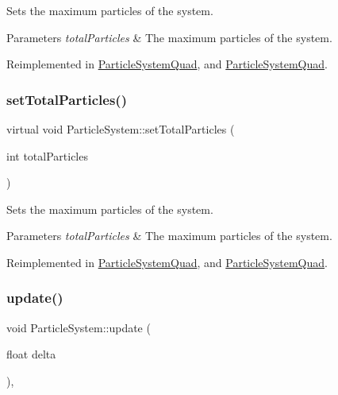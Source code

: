 Sets the maximum particles of the system.


\begin{DoxyParams}{Parameters}
{\em total\+Particles} & The maximum particles of the system. \\
\hline
\end{DoxyParams}


Reimplemented in \hyperlink{classParticleSystemQuad_a8798b3c44a7db32d7ab5b76e245edd27}{Particle\+System\+Quad}, and \hyperlink{classParticleSystemQuad_a11be26d03c7ddefb91f16a93fb849439}{Particle\+System\+Quad}.

\mbox{\label{classParticleSystem_a441ed0a02ecc1ed7b72ba4fb307e1bd4}} 
\subsubsection{\texorpdfstring{set\+Total\+Particles()}{setTotalParticles()}\hspace{0.1cm}{\footnotesize\ttfamily [2/2]}}
{\footnotesize\ttfamily virtual void Particle\+System\+::set\+Total\+Particles (\begin{DoxyParamCaption}\item[{int}]{total\+Particles }\end{DoxyParamCaption})\hspace{0.3cm}{\ttfamily [virtual]}}

Sets the maximum particles of the system.


\begin{DoxyParams}{Parameters}
{\em total\+Particles} & The maximum particles of the system. \\
\hline
\end{DoxyParams}


Reimplemented in \hyperlink{classParticleSystemQuad_a8798b3c44a7db32d7ab5b76e245edd27}{Particle\+System\+Quad}, and \hyperlink{classParticleSystemQuad_a11be26d03c7ddefb91f16a93fb849439}{Particle\+System\+Quad}.

\mbox{\label{classParticleSystem_a11a1c88736ddcd626ba8039b4268e82e}} 
\subsubsection{\texorpdfstring{update()}{update()}\hspace{0.1cm}{\footnotesize\ttfamily [1/2]}}
{\footnotesize\ttfamily void Particle\+System\+::update (\begin{DoxyParamCaption}\item[{float}]{delta }\end{DoxyParamCaption})\hspace{0.3cm}{\ttfamily [override]}, {\ttfamily [virtual]}}

